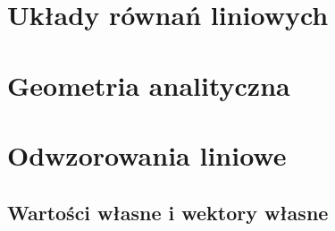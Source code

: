 \documentclass[11pt]{scrartcl}
\begin{document}
    \section{Układy równań liniowych}
    

    \section{Geometria analityczna}
    

    \section{Odwzorowania liniowe} \label{s:linear map}
    

        \subsection{Wartości własne i wektory własne}
        
\end{document}

